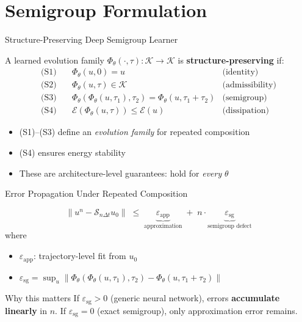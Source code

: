 \documentclass[aspectratio=169, 11pt]{beamer}
\newcommand{\cK}{\mathcal{K}}
\newcommand{\cE}{\mathcal{E}}
\newcommand{\cS}{\mathcal{S}}
\newcommand{\PhiT}{\Phi_{\theta}}
\newcommand{\norm}[1]{\left\lVert #1 \right\rVert}
\begin{document}
\section{Semigroup Formulation}

\begin{frame}{Structure-Preserving Deep Semigroup Learner}

\begin{definition}
A learned evolution family $\PhiT(\cdot,\tau):\cK\to\cK$ is \textbf{structure-preserving} if:
\begin{align}
    \text{(S1)}\quad & \PhiT(u,0) = u & \text{(identity)} \\
    \text{(S2)}\quad & \PhiT(u,\tau) \in \cK & \text{(admissibility)} \\
    \text{(S3)}\quad & \PhiT(\PhiT(u,\tau_1),\tau_2) = \PhiT(u,\tau_1{+}\tau_2) & \text{(semigroup)} \\
    \text{(S4)}\quad & \cE(\PhiT(u,\tau)) \leq \cE(u) & \text{(dissipation)}
\end{align}
\end{definition}

\vspace{0.2cm}
\begin{itemize}
    \item (S1)--(S3) define an \emph{evolution family} for repeated composition
    \item (S4) ensures energy stability
    \item These are \alert{architecture-level} guarantees: hold for \emph{every} $\theta$
\end{itemize}
\end{frame}

\begin{frame}{Error Propagation Under Repeated Composition}

\begin{theorem}
\[
\norm{u^n - \cS_{n\Delta t} u_0}
\;\leq\;
\underbrace{\varepsilon_{\mathrm{app}}}_{\text{approximation}}
\;+\;
n \cdot \underbrace{\varepsilon_{\mathrm{sg}}}_{\text{semigroup defect}}
\]
where
\begin{itemize}
    \item $\varepsilon_{\mathrm{app}}$: trajectory-level fit from $u_0$
    \item $\varepsilon_{\mathrm{sg}} = \sup_u \norm{\PhiT(\PhiT(u,\tau_1),\tau_2) - \PhiT(u,\tau_1{+}\tau_2)}$
\end{itemize}
\end{theorem}

\vspace{0.2cm}
\begin{alertblock}{Why this matters}
If $\varepsilon_{\mathrm{sg}} > 0$ (generic neural network), errors \textbf{accumulate linearly} in $n$.
If $\varepsilon_{\mathrm{sg}} = 0$ (exact semigroup), only approximation error remains.
\end{alertblock}
\end{frame}
\end{document}
